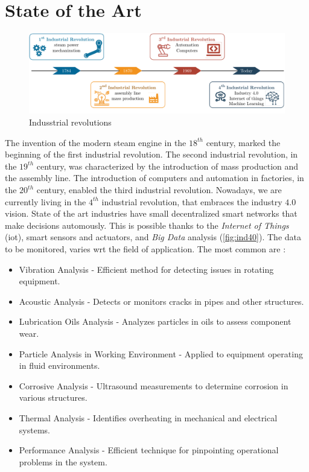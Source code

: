 \chapter{State of the Art}
\label{ch:state_of_the_art}

\begin{figure}[h]
    \centering
    \includegraphics[width=\textwidth]{images/StateArt/Industry40.pdf}
    \caption{Indusstrial revolutions}
    \label{fig:ind40}    
\end{figure}

The invention of the modern steam engine in the $18^{th}$ century, marked the beginning of the first industrial revolution. The second industrial revolution, in the $19^{th}$ century, was characterized by the introduction of mass production and the assembly line. The introduction of computers and automation in factories, in the $20^{th}$ century, enabled the third industrial revolution. Nowadays, we are currently living in the $4^{th}$ industrial revolution, that embraces the industry $4.0$ vision. State of the art industries have small decentralized smart networks that make decisions automously. This is possible thanks to the \emph{Internet of Things} (\gls{iot}), smart sensors and actuators, and \emph{Big Data} analysis (\autoref{fig:ind40}). 
The data to be monitored, varies \gls{wrt} the field of application. The most common are \cite{State_Art_Coanda_2020}:
\begin{itemize}
    \item Vibration Analysis - Efficient method for detecting issues in rotating equipment.
    \item Acoustic Analysis - Detects or monitors cracks in pipes and other structures.
    \item Lubrication Oils Analysis - Analyzes particles in oils to assess component wear.
    \item Particle Analysis in Working Environment - Applied to equipment operating in fluid environments.
    \item Corrosive Analysis - Ultrasound measurements to determine corrosion in various structures.
    \item Thermal Analysis - Identifies overheating in mechanical and electrical systems.
    \item Performance Analysis - Efficient technique for pinpointing operational problems in the system.
\end{itemize}



